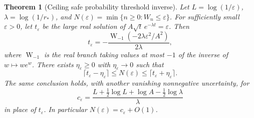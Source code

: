\documentclass[11pt,letterpaper]{article}
\newtheorem{theorem}{Theorem}[section]
\theoremstyle{remark}\newtheorem{remark}[theorem]{Remark}
\numberwithin{equation}{section}
\begin{document}
\begin{theorem}[Ceiling safe probability threshold inverse]\label{ppg:lead:thm:threshold}
Let $L=\log(1/\varepsilon)$, $\lambda=\log(1/r_*)$, and
$N(\varepsilon)=\min\{n\ge0:W_n\le\varepsilon\}$. For sufficiently small $\varepsilon>0$, let $t_\varepsilon$ be the large real solution of
$A\sqrt t\,e^{-\lambda t}=\varepsilon$. Then
\begin{equation}\label{ppg:lead:eq:lambert}
 t_\varepsilon=-\frac{\operatorname W_{-1}(-2\lambda\varepsilon^2/A^2)}{2\lambda},
\end{equation}
where $\operatorname W_{-1}$ is the real branch taking values at most $-1$ of the inverse of $w\mapsto we^w$. There exists $\eta_\varepsilon\ge0$ with $\eta_\varepsilon\to0$ such that
\begin{equation}\label{ppg:lead:eq:thresholdceil}
 \lceil t_\varepsilon-\eta_\varepsilon\rceil
 \le N(\varepsilon)\le
 \lceil t_\varepsilon+\eta_\varepsilon\rceil.
\end{equation}
The same conclusion holds, with another vanishing nonnegative uncertainty, for
\begin{equation}\label{ppg:lead:eq:thresholdcenter}
 c_\varepsilon=
 \frac{L+\tfrac12\log L+\log A-\tfrac12\log\lambda}{\lambda}
\end{equation}
in place of $t_\varepsilon$. In particular
$N(\varepsilon)=c_\varepsilon+O(1)$.
\end{theorem}
\end{document}
